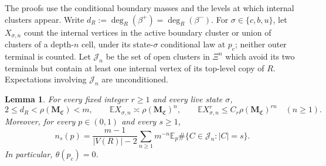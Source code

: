 \documentclass[scheme=plain,11pt]{ctexart}
\newtheorem{lemma}[theorem]{Lemma}
\theoremstyle{definition}
\theoremstyle{remark}
\begin{document}
The proofs use the conditional boundary masses and the levels at which internal clusters appear.
Write $d_R:=\deg_R(\beta^+)=\deg_R(\beta^-)$.
For $\sigma\in\{c,b,u\}$, let $X_{\sigma,n}$ count the internal vertices in the active boundary cluster or union of clusters of a depth-$n$ cell, under its state-$\sigma$ conditional law at $p_c$; neither outer terminal is counted.
Let $\mathcal J_n$ be the set of open clusters in $\Xi^n$ which avoid its two terminals but contain at least one internal vertex of its top-level copy of $R$.
Expectations involving $\mathcal J_n$ are unconditioned.

\begin{lemma}\label{lem:conditional-mass-moments}
For every fixed integer $r\ge1$ and every live state $\sigma$,
\[
 2\le d_R<\rho(\mathbf M_{\mathfrak C})<m,\qquad
 \mathbb E X_{\sigma,n}\asymp\rho(\mathbf M_{\mathfrak C})^n,
 \qquad
 \mathbb E X_{\sigma,n}^{r}\le C_r\rho(\mathbf M_{\mathfrak C})^{rn}
 \quad(n\ge1).
\]
Moreover, for every $p\in(0,1)$ and every $s\ge1$,
\begin{equation}\label{eq:birth-cluster-series}
 n_s(p)=\frac{m-1}{|V(R)|-2}
 \sum_{n\ge1}m^{-n}\mathbb E_p
 \#\{C\in\mathcal J_n:|C|=s\}.
\end{equation}
In particular, $\theta(p_c)=0$.
\end{lemma}
\end{document}
